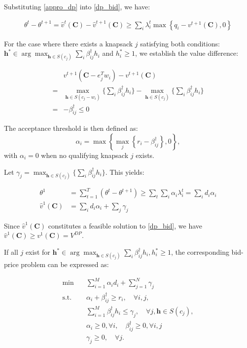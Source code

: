 Substituting \eqref{appro_dp} into \eqref{dp_bid}, we have:

\begin{align}
    \theta^{t} - \theta^{t+1} = \hat{v}^{t}(\bm{C}) - \hat{v}^{t+1}(\bm{C}) \geq \sum_{i} \lambda_{i}^{t} \max\left\{q_{i} - v^{t+1}(\bm{C}), 0\right\}
\end{align}

For the case where there exists a knapsack $j$ satisfying both conditions: $\bm{h}^{*} \in \arg\max_{\bm{h} \in S(c_j)} \sum_{i} \beta_{ij}^{\dag} h_{i}$ and $h_{i}^{*} \geq 1$, we establish the value difference: 

\begin{align*}
    & v^{t+1}(\bm{C} - e_{j}^{T} w_{i}) - v^{t+1}(\bm{C}) \\ 
  = & \max_{\bm{h} \in S(c_{j}- w_{i})} \{\sum_{i} \beta_{ij}^{\dag} h_{i}\} - \max_{\bm{h} \in S(c_{j})} \{\sum_{i} \beta_{ij}^{\dag} h_{i}\} \\
  = & -\beta_{ij}^{\dag} \leq 0
\end{align*}

The acceptance threshold is then defined as:
$$\alpha_{i} = \max\left\{\max_{j}\left\{r_i - \beta_{ij}^{\dag} \right\}, 0\right\},$$ 
with $\alpha_{i} = 0$ when no qualifying knapsack $j$ exists.

Let $\gamma_{j} = \max_{\bm{h} \in S(c_{j})} \{\sum_{i} \beta_{ij}^{\dag} h_{i}\}$. This yields:

\begin{align*}
    \theta^{1} & = \sum_{t=1}^{T} (\theta^{t} - \theta^{t+1}) \geq \sum_{t} \sum_{i} \alpha_{i} \lambda_{i}^{t} = \sum_{i} d_{i} \alpha_{i} \\
    \hat{v}^{1}(\bm{C}) & = \sum_{i} d_{i} \alpha_{i} + \sum_{j} \gamma_{j}
\end{align*}

Since $\hat{v}^{1}(\bm{C})$ constitutes a feasible solution to \eqref{dp_bid}, we have $\hat{v}^{1}(\bm{C}) \geq v^{1}(\bm{C}) =  V^{DP}$.

If all $j$ exist for $\bm{h}^{*} \in \arg\max_{\bm{h} \in S(c_j)} \sum_{i} \beta_{ij}^{\dag} h_{i}, h_{i}^{*} \geq 1$, the corresponding bid-price problem can be expressed as:

\begin{equation}\label{improve_bid}
    \begin{aligned}
    \min \quad & \sum_{i=1}^M \alpha_i d_i+ \sum_{j=1}^N \gamma_j \\
    \mathrm{s.t.} \quad & \alpha_i+ \beta_{ij}^{\dag} \geq r_i, \quad \forall i, j, \\
    & \sum_{i=1}^M \beta_{ij}^{\dag} h_i \leq \gamma_j, \quad \forall j, \bm{h} \in S(c_j), \\
    & \alpha_i \geq 0, \forall i, \quad \beta_{ij}^{\dag} \geq 0, \forall i, j \\
    & \gamma_j \geq 0, \quad \forall j.
    \end{aligned}
\end{equation}

